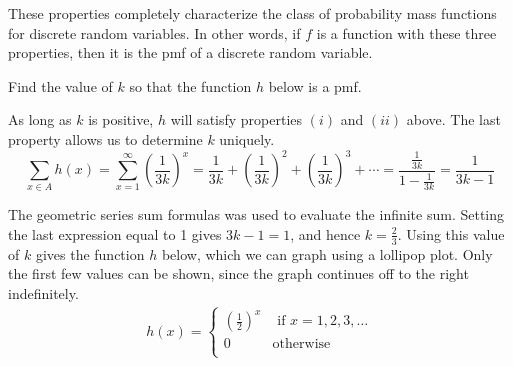 \begin{remark}These properties completely characterize the class of probability mass functions for discrete random variables. In other words, if $f$ is a function with these three properties, then it is the pmf of a discrete random variable.\end{remark}

\begin{example}
Find the value of $k$ so that the function $h$ below is a pmf.
\renewcommand*{\arraystretch}{1.35}
\renewcommand*{\arraystretch}{1}

As long as $k$ is positive, $h$ will satisfy properties $(i)$ and $(ii)$ above. The last property allows us to determine $k$ uniquely.
$$\sum_{x \in A} h(x) =  \sum_{x = 1}^{\infty} \left(\frac{1}{3k}\right)^x = \frac{1}{3k} +  \left(\frac{1}{3k}\right)^2 +  \left(\frac{1}{3k}\right)^3 + \cdots = \frac{\frac{1}{3k}}{1-\frac{1}{3k}} = \frac{1}{3k - 1}$$

The geometric series sum formulas was used to evaluate the infinite sum. Setting the last expression equal to 1 gives $3k - 1 = 1$, and hence $k = \frac{2}{3}$. Using this value of $k$ gives the function $h$ below, which we can graph using a lollipop plot. Only the first few values can be shown, since the graph continues off to the right indefinitely.
\renewcommand*{\arraystretch}{1.35}
$$\begin{aligned}h(x) = \left\{
\begin{array}{cl}
      \left(\frac{1}{2}\right)^x & \text{ if \ } x = 1, 2, 3, \dots \\
      0 & \text{otherwise} \\ \end{array} 
\right.\end{aligned}$$

\renewcommand*{\arraystretch}{1}
\begin{center}
\end{center}
\end{example}

